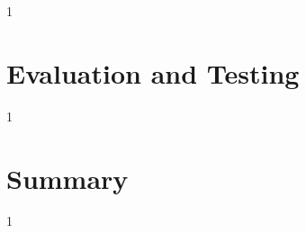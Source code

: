 \documentclass[12pt,a4paper,titlepage,listof=totoc,bibliography=totoc,chapteratlists=0pt]{scrreprt}
\begin{document}
\begin{spacing}{1}
\chapter{Evaluation and Testing}
\end{spacing}


\begin{spacing}{1}
\chapter{Summary}
\end{spacing}


\clearpage
\setauthor{}

\setcounter{page}{\value{RPages}}


\glsnogroupskiptrue

\printglossary[title=Glossary,toctitle=Glossary] %

\begin{spacing}{1}
\newpage



\end{spacing}

\newpage
\listoffigures
\listoftables
\lstlistoflistings

\appendix


\setauthor{\secondauthor}


\end{document}
